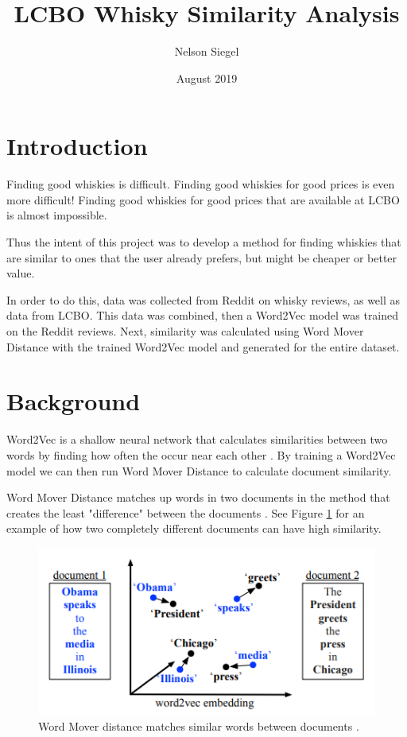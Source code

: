 \documentclass{article}
\title{LCBO Whisky Similarity Analysis}
\author{Nelson Siegel}
\date{August 2019}
\begin{document}
\maketitle
\newpage
\tableofcontents
\newpage

\section{Introduction}

Finding good whiskies is difficult. Finding good whiskies for good prices is even more difficult! Finding good whiskies for good prices that are available at LCBO is almost impossible.

Thus the intent of this project was to develop a method for finding whiskies that are similar to ones that the user already prefers, but might be cheaper or better value.

In order to do this, data was collected from Reddit on whisky reviews, as well as data from LCBO. This data was combined, then a Word2Vec model was trained on the Reddit reviews. Next, similarity was calculated using Word Mover Distance with the trained Word2Vec model and generated for the entire dataset.

\section{Background}

Word2Vec is a shallow neural network that calculates similarities between two words by finding how often the occur near each other \cite{word2vec}. By training a Word2Vec model we can then run Word Mover Distance to calculate document similarity. 

Word Mover Distance matches up words in two documents in the method that creates the least "difference" between the documents \cite{wordmover}. See Figure \ref{fig:wordmoverdistance} for an example of how two completely different documents can have high similarity.

\begin{figure}[h]
\includegraphics[width=\textwidth]{wordmoverdistance}
\centering
\caption{Word Mover distance matches similar words between documents \cite{wordmover}.}
\label{fig:wordmoverdistance}
\end{figure}
\end{document}
